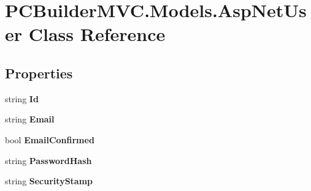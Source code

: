 \hypertarget{class_p_c_builder_m_v_c_1_1_models_1_1_asp_net_user}{}\section{P\+C\+Builder\+M\+V\+C.\+Models.\+Asp\+Net\+User Class Reference}
\label{class_p_c_builder_m_v_c_1_1_models_1_1_asp_net_user}
\subsection*{Properties}
\begin{DoxyCompactItemize}
\item 
string {\bfseries Id}\hypertarget{class_p_c_builder_m_v_c_1_1_models_1_1_asp_net_user_a90fbe4981800475e56eaa613862f24e1}{}\label{class_p_c_builder_m_v_c_1_1_models_1_1_asp_net_user_a90fbe4981800475e56eaa613862f24e1}

\item 
string {\bfseries Email}\hypertarget{class_p_c_builder_m_v_c_1_1_models_1_1_asp_net_user_a4cc78fad14702a22cdac76ec509a0027}{}\label{class_p_c_builder_m_v_c_1_1_models_1_1_asp_net_user_a4cc78fad14702a22cdac76ec509a0027}

\item 
bool {\bfseries Email\+Confirmed}\hypertarget{class_p_c_builder_m_v_c_1_1_models_1_1_asp_net_user_a25e057f79a8f118f0f3aedbd4f814100}{}\label{class_p_c_builder_m_v_c_1_1_models_1_1_asp_net_user_a25e057f79a8f118f0f3aedbd4f814100}

\item 
string {\bfseries Password\+Hash}\hypertarget{class_p_c_builder_m_v_c_1_1_models_1_1_asp_net_user_a8c7f19af5fd87f87a9de0bbf0cad70b4}{}\label{class_p_c_builder_m_v_c_1_1_models_1_1_asp_net_user_a8c7f19af5fd87f87a9de0bbf0cad70b4}

\item 
string {\bfseries Security\+Stamp}\hypertarget{class_p_c_builder_m_v_c_1_1_models_1_1_asp_net_user_a4ce9973b3197d4df7afceb114de1ed02}{}\label{class_p_c_builder_m_v_c_1_1_models_1_1_asp_net_user_a4ce9973b3197d4df7afceb114de1ed02}


\end{DoxyCompactItemize}

